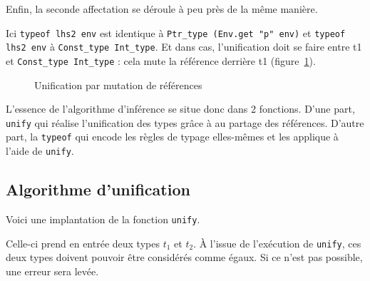 Enfin, la seconde affectation se déroule à peu près de la même manière.


Ici \texttt{typeof lhs2 env} est identique à \texttt{Ptr\_type (Env.get "p"
env)} et \texttt{typeof lhs2 env} à \texttt{Const\_type Int\_type}. Et dans cas,
l'unification doit se faire entre t1 et \texttt{Const\_type Int\_type} : cela
mute la référence derrière t1 (figure~\ref{fig:typeunifref}).

\begin{figure}
  \caption{Unification par mutation de références}
  \label{fig:typeunifref}
\end{figure}

L'essence de l'algorithme d'inférence se situe donc dans 2 fonctions. D'une
part, \texttt{unify} qui réalise l'unification des types grâce à au partage des
références. D'autre part, la \texttt{typeof} qui encode les règles de typage
elles-mêmes et les applique à l'aide de \texttt{unify}.

\subsection*{Algorithme d'unification}

Voici une implantation de la fonction \texttt{unify}.

Celle-ci prend en entrée deux types $t_1$ et $t_2$. À l'issue de l'exécution de
\texttt{unify}, ces deux types doivent pouvoir être considérés comme égaux. Si
ce n'est pas possible, une erreur sera levée.

